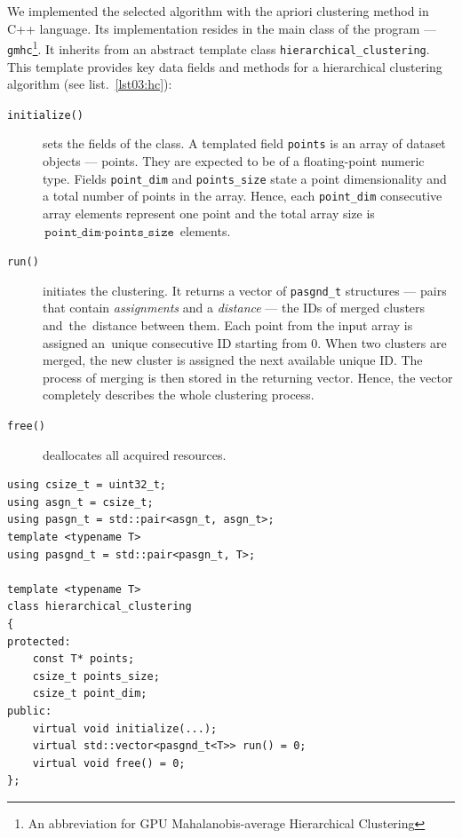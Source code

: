 We implemented the selected algorithm with the apriori clustering method in C++ language. Its implementation resides in the main class of the program --- \texttt{gmhc}\footnote{An abbreviation for GPU Mahalanobis-average Hierarchical Clustering}. It inherits from an abstract template class \texttt{hierarchical\_clustering}.
This template provides key data fields and methods for a hierarchical clustering algorithm (see list.~\ref{lst03:hc}): 

\begin{description}
	\item[\texttt{initialize()}] sets the fields of the class. A templated field \texttt{points} is an array of dataset objects --- points. They are expected to be of a floating-point numeric type. Fields \texttt{point\_dim} and \texttt{points\_size} state a point dimensionality and a total number of points in the array. Hence, each \texttt{point\_dim} consecutive array elements represent one point and the total array size is~$\texttt{point\_dim}\cdot\texttt{points\_size}$ elements.
	
	\item[\texttt{run()}] initiates the clustering. It returns a vector of \texttt{pasgnd\_t} structures --- pairs that contain \emph{assignments} and a \emph{distance} --- the IDs of merged clusters and~the~distance between them. Each point from the input array is assigned an~unique consecutive ID starting from $0$. When two clusters are merged, the new cluster is assigned the next available unique ID. The process of merging is then stored in the returning vector. Hence, the vector completely describes the whole clustering process.
	
	\item[\texttt{free()}] deallocates all acquired resources.
\end{description}

\begin{lstlisting}[caption={A summary of \texttt{hierarchical\_clustering} header file.},label={lst03:hc}]
using csize_t = uint32_t;
using asgn_t = csize_t;
using pasgn_t = std::pair<asgn_t, asgn_t>;
template <typename T>
using pasgnd_t = std::pair<pasgn_t, T>;

template <typename T>
class hierarchical_clustering
{
protected:
	const T* points;
	csize_t points_size;
	csize_t point_dim;
public:
	virtual void initialize(...);
	virtual std::vector<pasgnd_t<T>> run() = 0;
	virtual void free() = 0;
};
\end{lstlisting}


